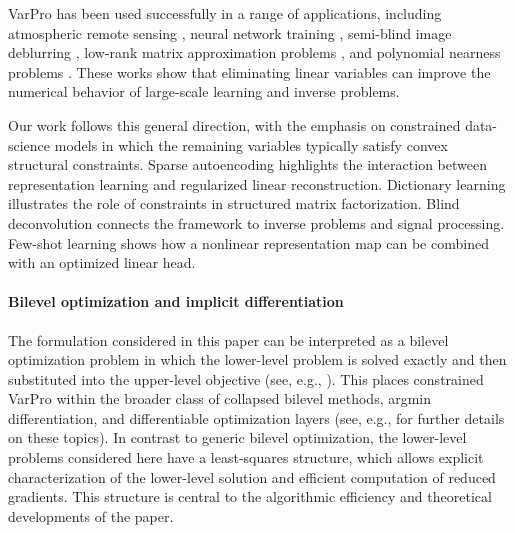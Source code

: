 \documentclass{article}
\begin{document}
VarPro has been used successfully in a range of applications, including atmospheric remote sensing \cite{barligea_varpro_remotesensing}, neural network training \cite{DONG2022115284,ruthotto_trainvarpro,ruthotto_slimtrain},
semi-blind image deblurring \cite{salzer2026variableprojectionmethodssolving}, low-rank matrix approximation problems \cite{USEVICH2014430,Markovsky_advances}, and polynomial nearness problems \cite{USEVICH2017176}.
These works show that eliminating linear variables can improve the numerical behavior of large-scale learning and inverse problems. 

Our work follows this general direction, with the emphasis on constrained data-science models in which the remaining variables typically satisfy convex structural constraints. 
Sparse autoencoding highlights the interaction between representation learning and regularized linear reconstruction. Dictionary learning illustrates the role of constraints in structured matrix factorization. Blind deconvolution connects the
framework to inverse problems and signal processing. Few-shot learning shows how a nonlinear representation map can be combined with an optimized linear head. 


\paragraph{Bilevel optimization and implicit differentiation}
The formulation considered in this paper can be interpreted as a bilevel optimization problem in which the lower-level problem is solved exactly and then substituted into the upper-level objective (see, e.g., \cite{bard1998practical,colson2007overview,dempe2020bilevel}). This places constrained VarPro within the broader class of collapsed bilevel methods, argmin differentiation, and differentiable optimization layers (see, e.g., \cite{agrawal2019differentiable,amos2017optnet,blondel2022efficient,franceschi2018bilevel,gould2016differentiating} for further details on these topics). In contrast to generic bilevel optimization, the lower-level problems considered here have a least-squares structure, which allows explicit characterization of the lower-level solution and efficient computation of reduced gradients. 
This structure is central to the algorithmic efficiency and theoretical developments of the paper.
\end{document}
